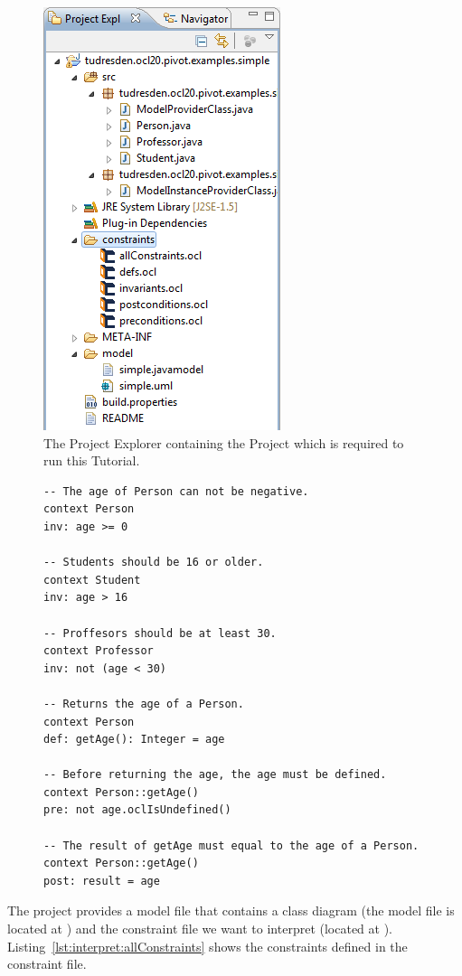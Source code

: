 \begin{figure}[!t]
	\centering
	\includegraphics[width=0.45\linewidth]{figures/examples/simple02}
	\caption{The Project Explorer containing the Project which is required to run
	this Tutorial.}
	\label{pic:example:simple02}
\end{figure}
	
\begin{figure}[!t]
  \lstset{
    language=OCL
  }
  \begin{lstlisting}[caption={The Constraints contained in the Constraint File.}, captionpos=b, label=lst:interpret:allConstraints]
-- The age of Person can not be negative.
context Person
inv: age >= 0

-- Students should be 16 or older.
context Student
inv: age > 16

-- Proffesors should be at least 30.
context Professor
inv: not (age < 30)

-- Returns the age of a Person.
context Person
def: getAge(): Integer = age

-- Before returning the age, the age must be defined.
context Person::getAge()
pre: not age.oclIsUndefined()

-- The result of getAge must equal to the age of a Person.
context Person::getAge()
post: result = age
  \end{lstlisting}
\end{figure}

The project provides a model file that contains a class diagram (the model file 
is located at ) and the constraint file we want to
interpret (located at 
). 
Listing~\ref{lst:interpret:allConstraints} shows the constraints defined in the
constraint file.

